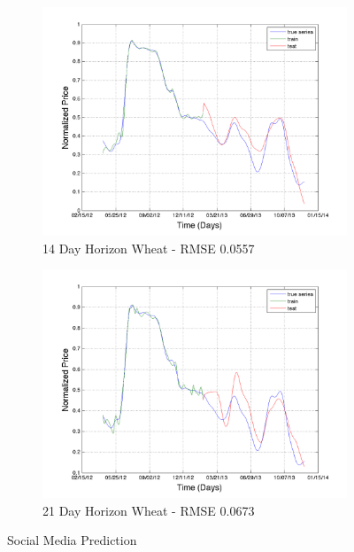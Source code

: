 \begin{figure}
        \begin{subfigure}[b]{0.5\textwidth}
                \includegraphics[width=\textwidth]{img/model/wheat/model3_3/pred_14}
                \caption{14 Day Horizon Wheat - RMSE 0.0557  }
                \label{fig:tiger}
        \end{subfigure}%
              \begin{subfigure}[b]{0.5\textwidth}
                \includegraphics[width=\textwidth]{img/model/wheat/model3_3/pred_21}
                \caption{21 Day Horizon Wheat  - RMSE 0.0673 }
                \label{fig:tiger}
        \end{subfigure}%
        \caption{Social Media Prediction}\label{fig:last_test}
\end{figure}







